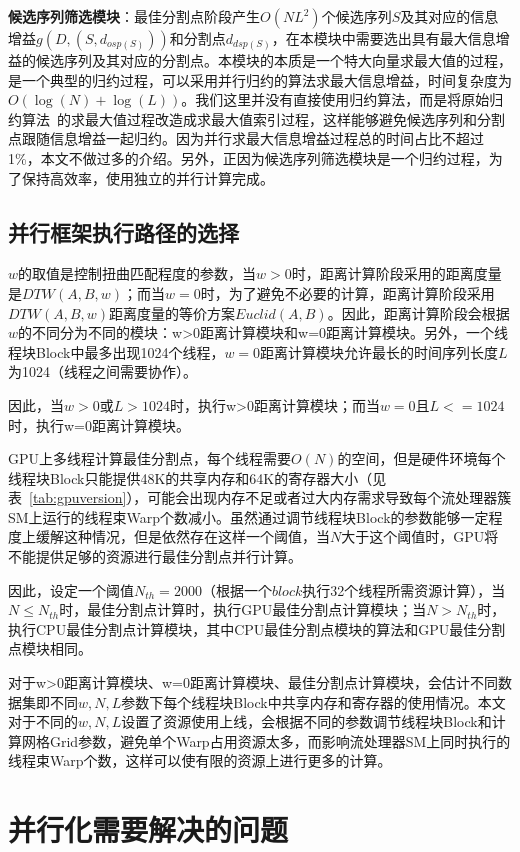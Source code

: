 \textbf{候选序列筛选模块}：最佳分割点阶段产生$O(NL^2)$个候选序列$S$及其对应的信息增益$g(D,(S,d_{osp(S)}))$和分割点$d_{dsp(S)}$，在本模块中需要选出具有最大信息增益的候选序列及其对应的分割点。本模块的本质是一个特大向量求最大值的过程，是一个典型的归约过程，可以采用并行归约的算法求最大信息增益，时间复杂度为$O(\log(N)+\log(L))$。我们这里并没有直接使用归约算法，而是将原始归约算法~\cite{harris2007optimizing}的求最大值过程改造成求最大值索引过程，这样能够避免候选序列和分割点跟随信息增益一起归约。因为并行求最大信息增益过程总的时间占比不超过1\%，本文不做过多的介绍。另外，正因为候选序列筛选模块是一个归约过程，为了保持高效率，使用独立的并行计算完成。

\subsection{并行框架执行路径的选择}
\label{cha:chap03:parachoose}

$w$的取值是控制扭曲匹配程度的参数，当$w>0$时，距离计算阶段采用的距离度量是$DTW(A,B,w)$；而当$w=0$时，为了避免不必要的计算，距离计算阶段采用$DTW(A,B,w)$距离度量的等价方案$Euclid(A,B)$。因此，距离计算阶段会根据$w$的不同分为不同的模块：w>0距离计算模块和w=0距离计算模块。另外，一个线程块Block中最多出现1024个线程，$w=0$距离计算模块允许最长的时间序列长度$L$为1024（线程之间需要协作）。

因此，当$w>0$或$L>1024$时，执行w>0距离计算模块；而当$w=0$且$L<=1024$时，执行w=0距离计算模块。

GPU上多线程计算最佳分割点，每个线程需要$O(N)$的空间，但是硬件环境每个线程块Block只能提供48K的共享内存和64K的寄存器大小（见表~\ref{tab:gpuversion}），可能会出现内存不足或者过大内存需求导致每个流处理器簇SM上运行的线程束Warp个数减小。虽然通过调节线程块Block的参数能够一定程度上缓解这种情况，但是依然存在这样一个阈值，当$N$大于这个阈值时，GPU将不能提供足够的资源进行最佳分割点并行计算。

因此，设定一个阈值$N_{th}=2000$（根据一个$block$执行32个线程所需资源计算），当$N\leq N_{th}$时，最佳分割点计算时，执行GPU最佳分割点计算模块；当$N>N_{th}$时，执行CPU最佳分割点计算模块，其中CPU最佳分割点模块的算法和GPU最佳分割点模块相同。

对于w>0距离计算模块、w=0距离计算模块、最佳分割点计算模块，会估计不同数据集即不同$w,N,L$参数下每个线程块Block中共享内存和寄存器的使用情况。本文对于不同的$w,N,L$设置了资源使用上线，会根据不同的参数调节线程块Block和计算网格Grid参数，避免单个Warp占用资源太多，而影响流处理器SM上同时执行的线程束Warp个数，这样可以使有限的资源上进行更多的计算。


\section{并行化需要解决的问题}

